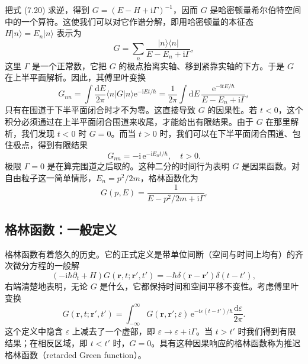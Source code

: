 把式 (7.20) 求逆，得到 $G=(E-H+\mathrm{i}\Gamma)^{-1}$，因而 $G$ 是哈密顿量希尔伯特空间中的一个算符。这使我们可以对它作谱分解，即用哈密顿量的本征态 $H|n\rangle=E_{n}|n\rangle$ 表示为
\begin{equation*}
G=\sum_{n}\frac{|n\rangle\langle n|}{E-E_{n}+\mathrm{i}\Gamma},\tag{7.31}
\end{equation*}
这里 $\Gamma$ 是一个正常数，它把 $G$ 的极点抬离实轴、移到紧靠实轴的下方。于是 $G$ 在上半平面解析。因此，其傅里叶变换
\begin{equation*}
G_{nn}=\int\frac{\mathrm{d}E}{2\pi}\langle n|G|n\rangle\mathrm{e}^{-\mathrm{i}Et/\hbar}=\frac{1}{2\pi}\int\mathrm{d}E\,\frac{\mathrm{e}^{-\mathrm{i}tE/\hbar}}{E-E_{n}+\mathrm{i}\Gamma},\tag{7.32}
\end{equation*}
只有在围道于下半平面闭合时才不为零。这直接导致 $G$ 的因果性。若 $t<0$，这个积分必须通过在上半平面闭合围道来收尾，才能给出有限结果。由于 $G$ 在那里解析，我们发现 $t<0$ 时 $G=0$。而当 $t>0$ 时，我们可以在下半平面闭合围道、包住极点，得到有限结果
\begin{equation*}
G_{nn}=-\mathrm{i}\,\mathrm{e}^{-\mathrm{i}E_{n}t/\hbar},\quad t>0.\tag{7.33}
\end{equation*}
极限 $\Gamma=0$ 是在算完围道之后取的。这种二分的时间行为表明 $G$ 是因果函数。对自由粒子这一简单情形，$E_{n}=p^{2}/2m$，格林函数化为
\begin{equation*}
G(p,E)=\frac{1}{E-p^{2}/2m+\mathrm{i}\Gamma}.\tag{7.34}
\end{equation*}

\subsection{格林函数：一般定义}

格林函数有着悠久的历史。它的正式定义是带单位间断（空间与时间上均有）的齐次微分方程的一般解
\begin{equation*}
\left(-\mathrm{i}\hbar\partial_{t}+H\right)G(\mathbf{r},t;\mathbf{r}',t')=-\hbar\delta(\mathbf{r}-\mathbf{r}')\delta(t-t'),\tag{7.35}
\end{equation*}
右端清楚地表明，无论 $G$ 是什么，它都保持时间和空间平移不变性。考虑傅里叶变换
\begin{equation*}
G(\mathbf{r},t;\mathbf{r}',t')=\int_{-\infty}^{\infty}G(\mathbf{r},\mathbf{r}';\varepsilon)\,\mathrm{e}^{-\mathrm{i}\varepsilon(t-t')/\hbar}\frac{\mathrm{d}\varepsilon}{2\pi}.\tag{7.36}
\end{equation*}
这个定义中隐含 $\varepsilon$ 上减去了一个虚部，即 $\varepsilon\to\varepsilon+\mathrm{i}\Gamma$。当 $t>t'$ 时我们得到有限结果；在相反区域，即 $t<t'$ 时，$G=0$。具有这种因果响应的格林函数称为推迟格林函数（retarded Green function）。

